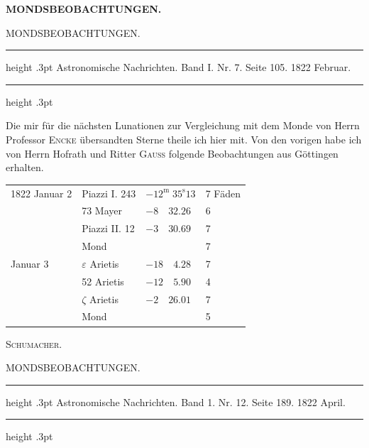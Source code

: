 \clearpage
\thispagestyle{empty}
\noindent{}%
\makebox[12mm][l]{}%
\parbox[t]{\dimexpr\linewidth-24mm\relax}{\centering\footnotesize\bfseries MONDSBEOBACHTUNGEN.\par}%
\par\nobreak\medskip
\begin{center}
{\large MONDSBEOBACHTUNGEN.}
\end{center}
\begin{center}
\parbox{.78\linewidth}{%
\centering\small
\hrule height .3pt\relax\vspace{2.5pt}
Astronomische Nachrichten. Band I. Nr. 7. Seite 105. 1822 Februar.\par
\vspace{2.5pt}\hrule height .3pt\relax
}
\end{center}

Die mir für die nächsten Lunationen zur Vergleichung mit dem Monde von Herrn Professor \textsc{Encke} übersandten Sterne theile ich hier mit. Von den vorigen habe ich von Herrn Hofrath und Ritter \textsc{Gauss} folgende Beobachtungen aus Göttingen erhalten.

\begin{center}
\begin{tabular}{l|l|l|l}
1822 Januar 2 & Piazzi I. 243 & $-12^{\mathrm{m}}\;35^{\mathrm{s}}13$ & 7 Fäden \\
 & 73 Mayer & $-8\quad32.26$ & 6 \\
 & Piazzi II. 12 & $-3\quad30.69$ & 7 \\
 & Mond & & 7 \\
Januar 3 & $\varepsilon$ Arietis & $-18\quad4.28$ & 7 \\
 & 52 Arietis & $-12\quad5.90$ & 4 \\
 & $\zeta$ Arietis & $-2\quad26.01$ & 7 \\
 & Mond & & 5 \\
\end{tabular}
\end{center}

\begin{flushright}
\textsc{Schumacher}.
\end{flushright}

\par\bigskip
{}
\hypertarget{native-446-part-lower}{}
\begin{center}
{\large MONDSBEOBACHTUNGEN.}
\end{center}
\begin{center}
\parbox{.76\linewidth}{%
\centering\small
\hrule height .3pt\relax\vspace{2.5pt}
Astronomische Nachrichten. Band 1. Nr. 12. Seite 189. 1822 April.\par
\vspace{2.5pt}\hrule height .3pt\relax
}
\end{center}

